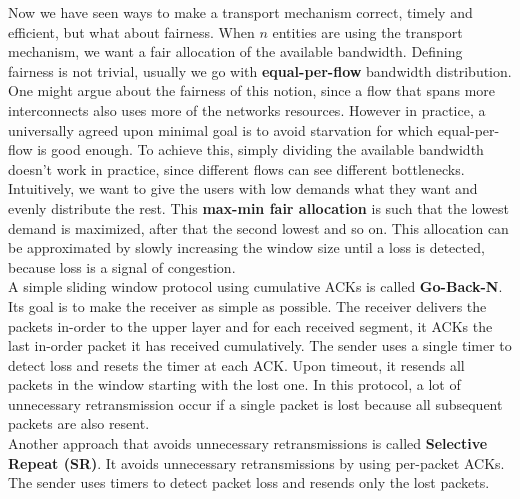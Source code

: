 Now we have seen ways to make a transport mechanism correct, timely and efficient, but what about fairness. When $n$ entities are using the transport mechanism, we want a fair allocation of the available bandwidth. Defining fairness is not trivial, usually we go with \textbf{equal-per-flow} bandwidth distribution. One might argue about the fairness of this notion, since a flow that spans more interconnects also uses more of the networks resources. However in practice, a universally agreed upon minimal goal is to avoid starvation for which equal-per-flow is good enough. To achieve this, simply dividing the available bandwidth doesn't work in practice, since different flows can see different bottlenecks. Intuitively, we want to give the users with low demands what they want and evenly distribute the rest. This \textbf{max-min fair allocation} is such that the lowest demand is maximized, after that the second lowest and so on. This allocation can be approximated by slowly increasing the window size until a loss is detected, because loss is a signal of congestion.\vspace{.3cm}\\

A simple sliding window protocol using cumulative ACKs is called \textbf{Go-Back-N}. Its goal is to make the receiver as simple as possible. The receiver delivers the packets in-order to the upper layer and for each received segment, it ACKs the last in-order packet it has received cumulatively. The sender uses a single timer to detect loss and resets the timer at each ACK. Upon timeout, it resends all packets in the window starting with the lost one. In this protocol, a lot of unnecessary retransmission occur if a single packet is lost because all subsequent packets are also resent.\vspace{.3cm}\\

Another approach that avoids unnecessary retransmissions is called \textbf{Selective Repeat (SR)}. It avoids unnecessary retransmissions by using per-packet ACKs. The sender uses timers to detect packet loss and resends only the lost packets. 

